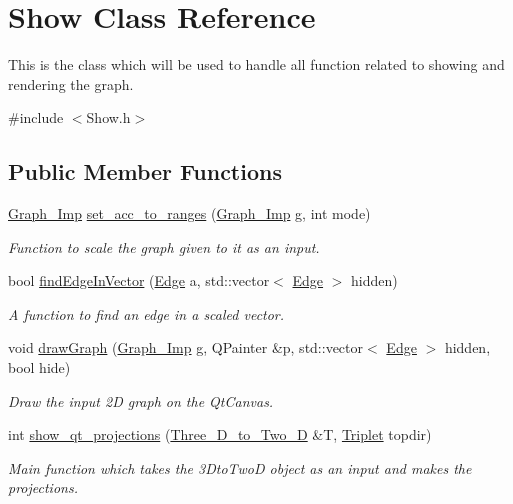\hypertarget{class_show}{}\section{Show Class Reference}
\label{class_show}


This is the class which will be used to handle all function related to showing and rendering the graph.  




{\ttfamily \#include $<$Show.\+h$>$}

\subsection*{Public Member Functions}
\begin{DoxyCompactItemize}
\item 
\mbox{\hyperlink{class_graph___imp}{Graph\+\_\+\+Imp}} \mbox{\hyperlink{class_show_ad17a90f324d44a841428434e39e87915}{set\+\_\+acc\+\_\+to\+\_\+ranges}} (\mbox{\hyperlink{class_graph___imp}{Graph\+\_\+\+Imp}} g, int mode)
\begin{DoxyCompactList}\small\item\em Function to scale the graph given to it as an input. \end{DoxyCompactList}\item 
\mbox{\label{class_show_a5a1a1552fb8062da10cbc64a16cea844}} 
bool \mbox{\hyperlink{class_show_a5a1a1552fb8062da10cbc64a16cea844}{find\+Edge\+In\+Vector}} (\mbox{\hyperlink{struct_edge}{Edge}} a, std\+::vector$<$ \mbox{\hyperlink{struct_edge}{Edge}} $>$ hidden)
\begin{DoxyCompactList}\small\item\em A function to find an edge in a scaled vector. \end{DoxyCompactList}\item 
void \mbox{\hyperlink{class_show_a0acae4ee3882e2df8671123ea1d7515c}{draw\+Graph}} (\mbox{\hyperlink{class_graph___imp}{Graph\+\_\+\+Imp}} g, Q\+Painter \&p, std\+::vector$<$ \mbox{\hyperlink{struct_edge}{Edge}} $>$ hidden, bool hide)
\begin{DoxyCompactList}\small\item\em Draw the input 2D graph on the Qt\+Canvas. \end{DoxyCompactList}\item 
int \mbox{\hyperlink{class_show_a674f8dc51bcf6c3d5808f5eb411dbf36}{show\+\_\+qt\+\_\+projections}} (\mbox{\hyperlink{class_three___d__to___two___d}{Three\+\_\+\+D\+\_\+to\+\_\+\+Two\+\_\+D}} \&T, \mbox{\hyperlink{struct_triplet}{Triplet}} topdir)
\begin{DoxyCompactList}\small\item\em Main function which takes the 3\+Dto\+TwoD object as an input and makes the projections. \end{DoxyCompactList}\end{DoxyCompactItemize}


